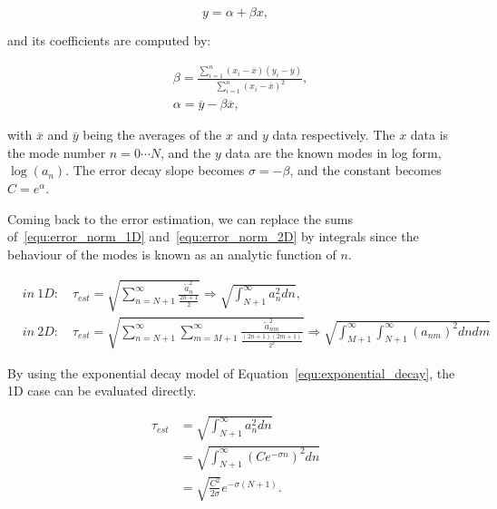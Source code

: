 \begin{equation}
    y = \alpha + \beta x,
\end{equation}

\noindent
and its coefficients are computed by:

\begin{align}
     & \beta = \frac{\sum_{i = 1}^{n}(x_i - \overline{x})(y_i - \overline{y})}{\sum_{i = 1}^{n}{(x_i -\overline{x})}^2}, \\
     & \alpha = \overline{y} - \beta \overline{x},
\end{align}

\noindent
with \(\overline{x}\) and \(\overline{y}\) being the averages of the \(x\) and \(y\) data
respectively. The \(x\) data is the mode number \(n = 0 \cdots N\), and the \(y\) data are the known
modes in log form, \( \log(a_n) \). The error decay slope becomes \(\sigma = - \beta \), and the
constant becomes \(C = e^\alpha \).

Coming back to the error estimation, we can replace the sums of~\ref{equ:error_norm_1D}
and~\ref{equ:error_norm_2D} by integrals since the behaviour of the modes is known as an analytic
function of \(n\).

\begin{align}
     & {in}\ 1D: \quad \tau_{est} = \sqrt{\sum_{n = N + 1}^{\infty } \frac{\widetilde{a}_n^2}{\frac{2n + 1}{2}}}
    \Rightarrow \sqrt{\int_{N + 1}^{\infty } a_n^2 dn}, \label{equ:error_1D}
    \\
     & {in}\ 2D: \quad \tau_{est} = \sqrt{\sum_{n = N + 1}^{\infty }\sum_{m = M + 1}^{\infty}\frac{\widetilde{a}^2_{nm}}{\frac{(2n + 1)(2m + 1)}{2^2}}}
    \Rightarrow \sqrt{\int_{M+1}^{\infty }\int_{N + 1 }^{\infty}{(a_{nm})}^2 dn dm} \label{equ:error_2D}
\end{align}

\noindent
By using the exponential decay model of Equation~\ref{equ:exponential_decay}, the 1D case can be
evaluated directly.

\begin{equation}
    \begin{aligned}
        \tau_{est} & = \sqrt{\int_{N + 1}^{\infty } a_n^2 dn}                             \\
                   & = \sqrt{\int_{N + 1}^{\infty } {\left( Ce^{-\sigma n} \right)}^2 dn} \\
                   & = \sqrt{\frac{C^2}{2\sigma }}e^{-\sigma (N + 1)}.
    \end{aligned}
\end{equation}

